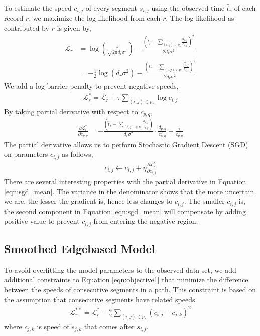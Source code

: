 \documentclass[draft]{sig-alternate}
\begin{document}
To estimate the speed $c_{i,j}$ of every segment $s_{i,j}$ using the observed time $\hat{t}_r$ of each record $r$, we maximize the log likelihood from each $r$. The log likelihood as contributed by $r$ is given by,
\begin{align*}
	\mathcal{L}_r &= \log \left( \frac{1}{\sqrt{2 \pi d_r \sigma^2 }} \right) - \frac{\left( \hat{t}_r - \sum_{ (i,j) \in p_r } \frac{d_{i,j}}{c_{i,j}} \right)^2}{2 d_r \sigma^2 } \\
	&= - \frac{1}{2} \log \left( d_r \sigma^2 \right) - \frac{\left( \hat{t}_r - \sum_{ (i,j) \in p_r } \frac{d_{i,j}}{c_{i,j}} \right)^2}{2 d_r \sigma^2 }
\end{align*}
We add a log barrier penalty to prevent negative speeds,
\begin{align}
	\label{eqn:objective1}
	\mathcal{L}^*_r = \mathcal{L}_r + \tau \sum_{(i,j) \in p_r} \log c_{i,j}
\end{align}
By taking partial derivative with respect to $c_{p,q}$,
\begin{align}
	\label{eqn:sgd_mean}
	\frac{\partial \mathcal{L}^*_r}{\partial c_{p,q}} = - \frac{\left( \hat{t}_r - \sum_{ (i,j) \in p_r } \frac{d_{i,j}}{c_{i,j}} \right)}{d_r \sigma^2 } \cdot \frac{d_{p,q}}{c_{p,q}^2} + \frac{\tau}{c_{p,q}}
\end{align}
The partial derivative allows us to perform Stochastic Gradient Descent (SGD) on parameters $c_{i,j}$ as follows,
\begin{align*}
	c_{i,j} \leftarrow c_{i,j} + \eta \frac{\partial \mathcal{L}^*_r}{\partial c_{i,j}}
\end{align*}
There are several interesting properties with the partial derivative in Equation \ref{eqn:sgd_mean}. The variance in the denominator shows that the more uncertain we are, the lesser the gradient is, hence less changes to $c_{i,j}$. The smaller $c_{i,j}$ is, the second component in Equation \ref{eqn:sgd_mean} will compensate by adding positive value to prevent $c_{i,j}$ from entering the negative region.

\subsection{Smoothed Edgebased Model}

To avoid overfitting the model parameters to the observed data set, we add additional constraints to Equation \ref{eqn:objective1} that minimize the difference between the speeds of consecutive segments in a path. This constraint is based on the assumption that consecutive segments have related speeds.
\begin{align*}
	\mathcal{L}^{**}_r = \mathcal{L}^*_r - \frac{\psi}{2} \sum_{(i,j) \in p_r} \left( c_{i,j} - c_{j,k} \right)^2
\end{align*}
where $c_{j,k}$ is speed of $s_{j,k}$ that comes after $s_{i,j}$.
\end{document}
